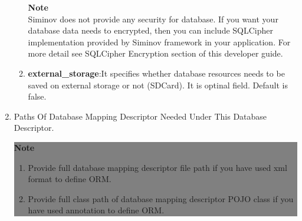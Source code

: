 \begin{enumerate}
\begin{enumerate}
\begin{center}
{{						\hfill \textbf{Note} \\

						\hfill 	Siminov does not provide any security for database. If you want your database data needs to encrypted, then you can include SQLCipher implementation provided by Siminov framework in your application. For more detail see SQLCipher Encryption section of this developer guide.

						\vspace*{0.0cm} %
					}
			}

			\end{center}

			\item \small \textbf{external\_storage}:It specifies whether database resources needs to be saved on external storage or not (SDCard). It is optinal field. Default is false.

		\end{enumerate}


	\item \small Paths Of Database Mapping Descriptor Needed Under This Database Descriptor. 

			\begin{center}
				\colorbox{grey}{
					\parbox[t]{.8\linewidth}{
						\fontsize{11pt}{11pt}\selectfont %
						\vspace*{0.1cm} %
		
						\hfill \textbf{Note} \\

						\hfill 

						\begin{enumerate}

							\item \small Provide full database mapping descriptor file path if you have used xml format to define ORM.

							\item \small Provide full class path of database mapping descriptor POJO class if you have used annotation to define ORM.
	
						\end{enumerate}

						\vspace*{0.0cm} %
					}
			}


\end{center}
\end{enumerate}
